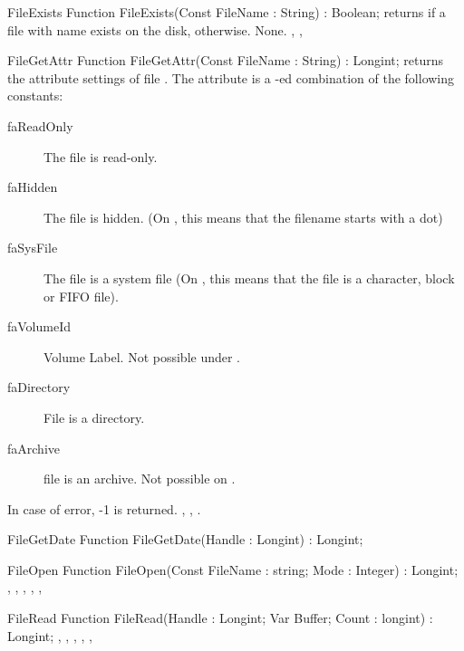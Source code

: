  
\begin{function}{FileExists}
\Declaration
Function FileExists(Const FileName : String) : Boolean;
\Description
{} returns  if a file with name 
exists on the disk,  otherwise.
\Errors
None.
\SeeAlso
{}, , 
\end{function}

 
\begin{function}{FileGetAttr}
\Declaration
Function FileGetAttr(Const FileName : String) : Longint;
\Description
{} returns the attribute settings of file 
. The attribute is a -ed combination
of the following constants: 
\begin{description}
\item[faReadOnly] The file is read-only.
\item[faHidden] The file is hidden. (On \linux, this means that the filename
starts with a dot)
\item[faSysFile] The file is a system file (On \linux, this means that the
file is a character, block or FIFO file).
\item[faVolumeId] Volume Label. Not possible under \linux.
\item[faDirectory] File is a directory.
\item[faArchive] file is an archive. Not possible on \linux.
\end{description}
\Errors
In case of error, -1 is returned.
\SeeAlso
{}, , .
\end{function}

\begin{function}{FileGetDate}
\Declaration
Function FileGetDate(Handle : Longint) : Longint;
\Description
\Errors
\SeeAlso
\end{function}

 
\begin{function}{FileOpen}
\Declaration
Function FileOpen(Const FileName : string; Mode : Integer) : Longint;
\Description
\Errors
\SeeAlso
{}, , , ,
, 
\end{function}

 
\begin{function}{FileRead}
\Declaration
Function FileRead(Handle : Longint; Var Buffer; Count : longint) : Longint;
\Description
\Errors
\SeeAlso
{}, , , ,
, 
\end{function}

